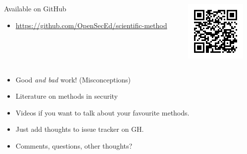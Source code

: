 \begin{frame}[fragile]
  \begin{columns}
    \begin{column}{0.7\columnwidth}
      \begin{block}{Available on GitHub}
        \begin{itemize}
          \item \url{https://github.com/OpenSecEd/scientific-method}
        \end{itemize}
      \end{block}
    \end{column}
    \begin{column}{0.3\columnwidth}
      \includegraphics[width=\columnwidth]{figs/GHurl.png}
    \end{column}
  \end{columns}

  \begin{remark}[Contributions]
    \begin{itemize}
      \item<+> Good \emph{and bad} work! (Misconceptions)
      \item<+> Literature on methods in security
      \item<+> Videos if you want to talk about your favourite methods.
      \item<+> Just add thoughts to issue tracker on GH.
    \end{itemize}
  \end{remark}
\end{frame}

\begin{frame}
  \begin{question}
    \begin{itemize}
      \item Comments, questions, other thoughts?
    \end{itemize}
  \end{question}
\end{frame}



\begin{frame}[allowframebreaks]
  \printbibliography
\end{frame}

